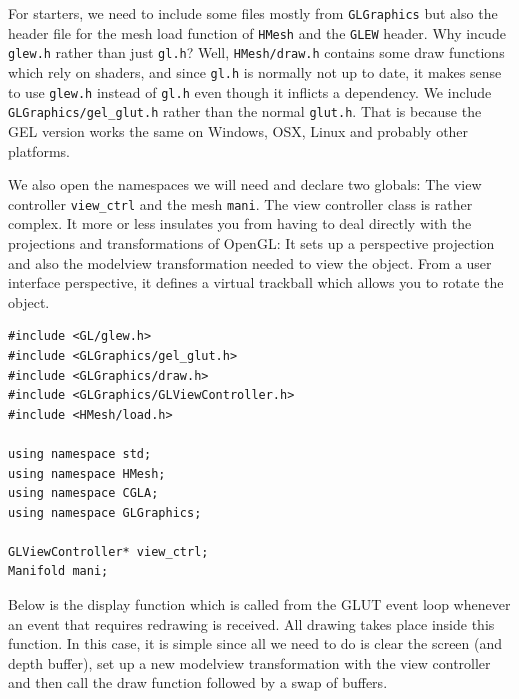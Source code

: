\documentclass[a4paper]{article}
\begin{document}
For starters, we need to include some files mostly from \texttt{GLGraphics} but also the header file for the mesh load function of \texttt{HMesh} and the \texttt{GLEW} header. Why incude \texttt{glew.h} rather than just \texttt{gl.h}? Well, \texttt{HMesh/draw.h} contains some draw functions which rely on shaders, and since \texttt{gl.h} is normally not up to date, it makes sense to use \texttt{glew.h} instead of \texttt{gl.h} even though it inflicts a dependency. We include \texttt{GLGraphics/gel\_glut.h} rather than the normal \texttt{glut.h}. That is because the GEL version works the same on Windows, OSX, Linux and probably other platforms.

We also open the namespaces we will need and declare two globals: The view controller \texttt{view\_ctrl} and the mesh \texttt{mani}. The view controller class is rather complex. It more or less insulates you from having to deal directly with the projections and transformations of OpenGL: It sets up a perspective projection and also the modelview transformation needed to view the object. From a user interface perspective, it defines a virtual trackball which allows you to rotate the object.
\begin{verbatim}
#include <GL/glew.h>
#include <GLGraphics/gel_glut.h>
#include <GLGraphics/draw.h>
#include <GLGraphics/GLViewController.h>
#include <HMesh/load.h>

using namespace std;
using namespace HMesh;
using namespace CGLA;
using namespace GLGraphics;

GLViewController* view_ctrl;
Manifold mani;
\end{verbatim}

Below is the display function which is called from the GLUT event loop whenever an event that requires redrawing is received. All drawing takes place inside this function. In this case, it is simple since all we need to do is clear the screen (and depth buffer), set up a new modelview transformation with the view controller and then call the draw function followed by a swap of buffers.
\end{document}
